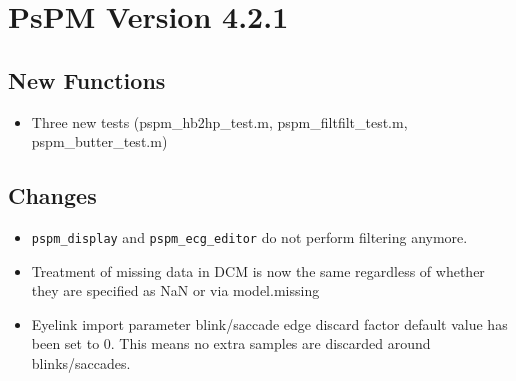 \documentclass[english]{article}
\numberwithin{equation}{section}
\numberwithin{figure}{section}
\begin{document}
\section{PsPM Version 4.2.1}

\subsection*{New Functions}
\begin{itemize}
\item Three new tests (pspm\_hb2hp\_test.m, pspm\_filtfilt\_test.m, pspm\_butter\_test.m)
\end{itemize}

\subsection*{Changes}
\begin{itemize}
\item \texttt{pspm\_display} and \texttt{pspm\_ecg\_editor} do not perform
filtering anymore.
\item Treatment of missing data in DCM is now the same regardless of whether
they are specified as NaN or via model.missing
\item Eyelink import parameter blink/saccade edge discard factor default
value has been set to 0. This means no extra samples are discarded
around blinks/saccades.
\end{itemize}
\end{document}
